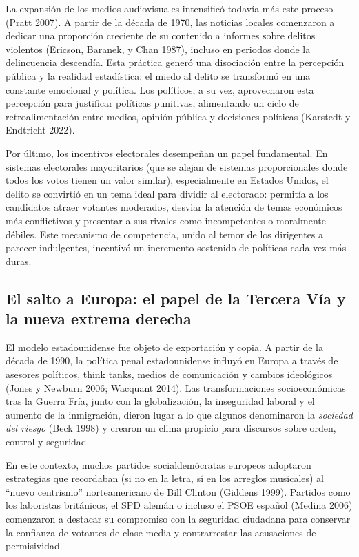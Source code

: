 \documentclass[
  spanish,
  letterpaper,
  DIV=11,
  numbers=noendperiod]{scrreprt}
\begin{document}
La expansión de los medios audiovisuales intensificó todavía más este
proceso (Pratt 2007). A partir de la década de 1970, las noticias
locales comenzaron a dedicar una proporción creciente de su contenido a
informes sobre delitos violentos (Ericson, Baranek, y Chan 1987),
incluso en periodos donde la delincuencia descendía. Esta práctica
generó una disociación entre la percepción pública y la realidad
estadística: el miedo al delito se transformó en una constante emocional
y política. Los políticos, a su vez, aprovecharon esta percepción para
justificar políticas punitivas, alimentando un ciclo de
retroalimentación entre medios, opinión pública y decisiones políticas
(Karstedt y Endtricht 2022).

Por último, los incentivos electorales desempeñan un papel fundamental.
En sistemas electorales mayoritarios (que se alejan de sistemas
proporcionales donde todos los votos tienen un valor similar),
especialmente en Estados Unidos, el delito se convirtió en un tema ideal
para dividir al electorado: permitía a los candidatos atraer votantes
moderados, desviar la atención de temas económicos más conflictivos y
presentar a sus rivales como incompetentes o moralmente débiles. Este
mecanismo de competencia, unido al temor de los dirigentes a parecer
indulgentes, incentivó un incremento sostenido de políticas cada vez más
duras.

\subsection{El salto a Europa: el papel de la Tercera Vía y la nueva
extrema
derecha}\label{el-salto-a-europa-el-papel-de-la-tercera-vuxeda-y-la-nueva-extrema-derecha}

El modelo estadounidense fue objeto de exportación y copia. A partir de
la década de 1990, la política penal estadounidense influyó en Europa a
través de asesores políticos, think tanks, medios de comunicación y
cambios ideológicos (Jones y Newburn 2006; Wacquant 2014). Las
transformaciones socioeconómicas tras la Guerra Fría, junto con la
globalización, la inseguridad laboral y el aumento de la inmigración,
dieron lugar a lo que algunos denominaron la \emph{sociedad del riesgo}
(Beck 1998) y crearon un clima propicio para discursos sobre orden,
control y seguridad.

En este contexto, muchos partidos socialdemócratas europeos adoptaron
estrategias que recordaban (si no en la letra, sí en los arreglos
musicales) al ``nuevo centrismo'' norteamericano de Bill Clinton
(Giddens 1999). Partidos como los laboristas británicos, el SPD alemán o
incluso el PSOE español (Medina 2006) comenzaron a destacar su
compromiso con la seguridad ciudadana para conservar la confianza de
votantes de clase media y contrarrestar las acusaciones de permisividad.
\end{document}
